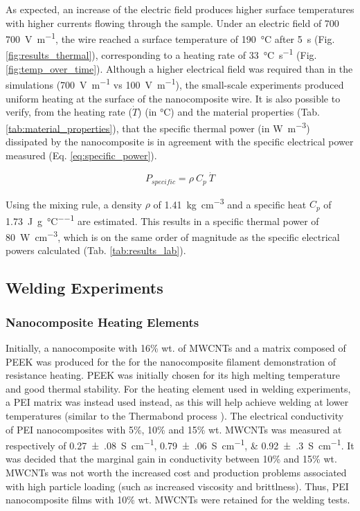 \documentclass[11pt,review,times]{elsarticle}
\begin{document}
As expected, an increase of the electric field produces higher surface temperatures with higher currents flowing through the sample. 
Under an electric field of 700 \SI{700}{\V\per\m}, the wire reached a surface temperature of \SI{190}{\celsius} after \SI{5}{\s} (Fig. \ref{fig:results_thermal}), corresponding to a heating rate of \SI{33}{\celsius\per\s} (Fig. \ref{fig:temp_over_time}). 
Although a higher electrical field was required than in the simulations (\SI{700}{\V\per\m} vs \SI{100}{\V\per\m}), the small-scale experiments produced uniform heating at the surface of the nanocomposite wire. 
It is also possible to verify, from the heating rate ($\dot{T}$) (in \si{\celsius}) and the material properties (Tab. \ref{tab:material_properties}), that the specific thermal power (in \si{\W\per\cubic\m}) dissipated by the nanocomposite is in agreement with the specific electrical power measured (Eq. \ref{eq:specific_power}).  

\begin{equation}
P_{specific} = \rho \ C_p \ \dot{T}
\label{eq:specific_power}
\end{equation}

Using the mixing rule, a density $\rho$ of \SI{1.41}{\kg\per\cubic\cm} and a specific heat $C_p$ of \SI{1,73}{\joule\per\g\per\celsius} are estimated. 
This results in a specific thermal power of \SI{80}{\W\per\cubic\cm}, which is on the same order of magnitude as the specific electrical powers calculated (Tab. \ref{tab:results_lab}).  

\FloatBarrier

\subsection{Welding Experiments}

\subsubsection{Nanocomposite Heating Elements}

Initially, a nanocomposite with 16\% wt. of MWCNTs and a matrix composed of PEEK was produced for the for the nanocomposite filament demonstration of resistance heating. 
PEEK was initially chosen for its high melting temperature and good thermal stability. 
For the heating element used in welding experiments, a PEI matrix was instead used instead, as this will help achieve welding at lower temperatures (similar to the Thermabond process \cite{Smiley1991a}). 
The electrical conductivity of PEI nanocomposites with 5\%, 10\% and 15\% wt. MWCNTs was measured at respectively of \SIlist[multi-part-units = single]{0.27(08);0.79(06);0.92(30)}{\siemens\per\cm}. 
It was decided that the marginal gain in conductivity between 10\% and 15\% wt. MWCNTs was not worth the increased cost and production problems associated with high particle loading (such as increased viscosity and brittlness). 
Thus, PEI nanocomposite films with 10\% wt. MWCNTs were retained for the welding tests. 
\end{document}
